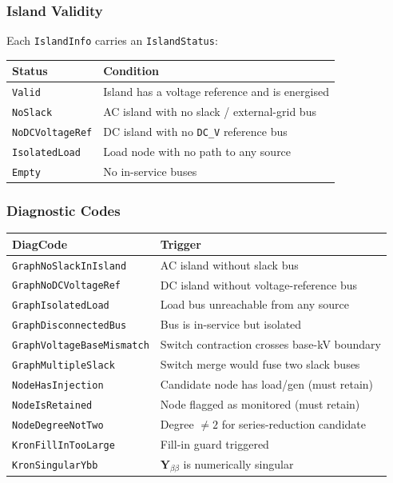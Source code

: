 \subsubsection{Island Validity}

Each \texttt{IslandInfo} carries an \texttt{IslandStatus}:

\begin{center}
\begin{tabular}{ll}
\hline\hline
\textbf{Status} & \textbf{Condition} \\
\hline
\texttt{Valid}          & Island has a voltage reference and is energised \\
\texttt{NoSlack}        & AC island with no slack / external-grid bus \\
\texttt{NoDCVoltageRef} & DC island with no \texttt{DC\_V} reference bus \\
\texttt{IsolatedLoad}   & Load node with no path to any source \\
\texttt{Empty}          & No in-service buses \\
\hline\hline
\end{tabular}
\end{center}

\subsubsection{Diagnostic Codes}

\begin{center}
\begin{tabular}{ll}
\hline\hline
\textbf{DiagCode} & \textbf{Trigger} \\
\hline
\texttt{GraphNoSlackInIsland}    & AC island without slack bus \\
\texttt{GraphNoDCVoltageRef}     & DC island without voltage-reference bus \\
\texttt{GraphIsolatedLoad}       & Load bus unreachable from any source \\
\texttt{GraphDisconnectedBus}    & Bus is in-service but isolated \\
\texttt{GraphVoltageBaseMismatch}& Switch contraction crosses base-kV boundary \\
\texttt{GraphMultipleSlack}      & Switch merge would fuse two slack buses \\
\texttt{NodeHasInjection}        & Candidate node has load/gen (must retain) \\
\texttt{NodeIsRetained}          & Node flagged as monitored (must retain) \\
\texttt{NodeDegreeNotTwo}        & Degree $\neq 2$ for series-reduction candidate \\
\texttt{KronFillInTooLarge}      & Fill-in guard triggered \\
\texttt{KronSingularYbb}         & $\mathbf{Y}_{\beta\beta}$ is numerically singular \\
\hline\hline
\end{tabular}
\end{center}

